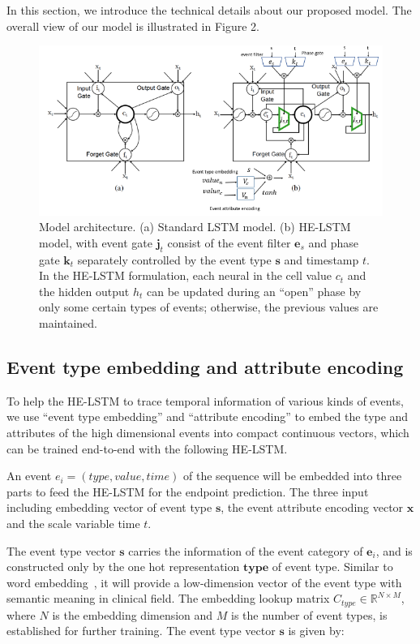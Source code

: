 \documentclass[letterpaper]{article} %
\begin{document}
In this section, we introduce the technical details about our proposed model. The overall view of our model is illustrated in Figure 2.



\begin{figure}[!t]
\centering

\includegraphics[width=.7\textwidth]{model.png}

\caption{Model architecture. (a) Standard LSTM model. (b) HE-LSTM model, with event gate $\bm j_t$ consist of the event filter $\bm e_s$ and phase gate $\bm k_t$
separately controlled by  the event type $\bm s$ and timestamp $t$. In the HE-LSTM formulation, each neural in the cell value $c_t$ and the hidden output
$h_t$ can be updated during an ``open'' phase by only some certain  types of events; otherwise, the previous values are maintained.}
\label{fig:overview}

\end{figure}



\subsection{Event type embedding and attribute encoding}
To help the HE-LSTM to trace temporal information of various kinds of events, we use ``event type embedding'' and ``attribute encoding'' to embed the type and attributes of the high dimensional events into compact continuous vectors, which can be trained end-to-end with the following HE-LSTM.

An event $e_i = (type,value,time)$ of the sequence will be embedded into three parts to feed the HE-LSTM for the endpoint prediction. The three input including  embedding vector of event type $\bm s$, the event attribute encoding vector $\bm x$ and the scale variable time $t$.

The event type vector $\bm s$ carries the information of the event category of $\bm e_i$, and is constructed only by the one hot representation $\bm{type}$ of event type. Similar to word embedding~\cite{mikolov2013distributed}, it will provide a low-dimension vector of the event type with semantic meaning in clinical field. The embedding lookup matrix $C_{type} \in \mathbb{R}^{N \times M}$,  where $N$ is the embedding dimension and $M$ is the number of event types, is established for further training. The event type vector $\bm s$ is given by:
\end{document}
